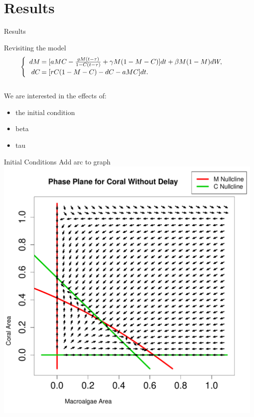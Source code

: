 
\section{Results}

\begin{frame}{Results}
  
  Revisiting the model
  $$\begin{cases}
    \begin{array}{rl}
      dM\hspace{-.8em}&=[aMC - \frac{gM(t-\tau)}{1-C(t-\tau)} + \gamma M (1-M-C)]dt+\beta M(1-M)dW,\\
      dC\hspace{-.8em}&=[rC(1-M-C) - dC - aMC]dt.\\
    \end{array}
    \end{cases}$$\\
  We are interested in the effects of:
  \begin{itemize}
  \item the initial condition\\
  \item beta\\
  \item tau\\
  \end{itemize}
  

\end{frame}

\begin{frame}{Initial Conditions}
Add arc to graph
\includegraphics[scale=.325]{./nullclines.pdf}

\end{frame}


